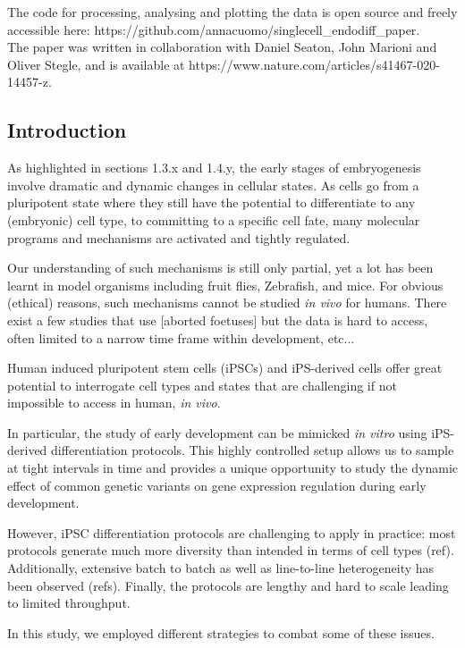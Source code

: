 The code for processing, analysing and plotting the data is open source and freely accessible here: https://github.com/annacuomo/singlecell\_endodiff\_paper.\\ 

The paper was written in collaboration with Daniel Seaton, John Marioni and Oliver Stegle, and is available at https://www.nature.com/articles/s41467-020-14457-z.

\subsection{Introduction}

As highlighted in sections 1.3.x and 1.4.y, the early stages of embryogenesis involve dramatic and dynamic changes in cellular states. 
As cells go from a pluripotent state where they still have the potential to differentiate to any (embryonic) cell type, to committing to a specific cell fate, many molecular programs and mechanisms are activated and tightly regulated.

Our understanding of such mechanisms is still only partial, yet a lot has been learnt in model organisms including fruit flies, Zebrafish, and mice. 
For obvious (ethical) reasons, such mechanisms cannot be studied \textit{in vivo} for humans. There exist a few studies that use [aborted foetuses] but the data is hard to access, often limited to a narrow time frame within development, etc...

Human induced pluripotent stem cells (iPSCs) and iPS-derived cells offer great potential to interrogate cell types and states that are challenging if not impossible to access in human, \textit{in vivo}.

In particular, the study of early development can be mimicked \textit{in vitro} using iPS-derived differentiation protocols. 
This highly controlled setup allows us to sample at tight intervals in time and provides a unique opportunity to study the dynamic effect of common genetic variants on gene expression regulation during early development.

However, iPSC differentiation protocols are challenging to apply in practice: most protocols generate much more diversity than intended in terms of cell types (ref). 
Additionally, extensive batch to batch as well as line-to-line heterogeneity has been observed (refs). Finally, the protocols are lengthy and hard to scale leading to limited throughput. 
 
In this study, we employed different strategies to combat some of these issues. 

